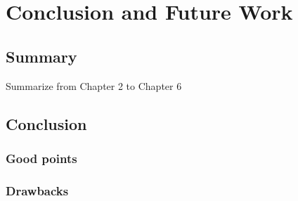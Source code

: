 \chapter{Conclusion and Future Work}
\label{conclusion}
\section{Summary}
    Summarize from Chapter 2 to Chapter 6

\section{Conclusion}
    \subsection{Good points}
    \subsection{Drawbacks}
